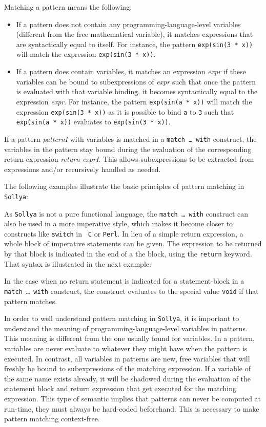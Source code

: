 \documentclass[a4paper]{article}
\newcommand{\key}[1]{\texttt{#1}}
\newcommand{\sollya}{\texttt{Sollya}\xspace}
\begin{document}
Matching a pattern means the following: 
\begin{itemize}
  \item If a pattern does not contain any programming-language-level
    variables (different from the free mathematical variable), it
    matches expressions that are syntactically equal to itself. For
    instance, the pattern \key{exp(sin(3 * x))} will match the
    expression \key{exp(sin(3 * x))}.
  \item If a pattern does contain variables, it matches an expression
    {\it expr} if these variables can be bound to subexpressions of
    {\it expr} such that once the pattern is evaluated with that
    variable binding, it becomes syntactically equal to the expression
    {\it expr}. For instance, the pattern \key{exp(sin(a * x))} will
    match the expression \key{exp(sin(3 * x))} as it is possible to
    bind \key{a} to \key{3} such that \key{exp(sin(a~*~x))} evaluates
    to \key{exp(sin(3~*~x))}.
\end{itemize}

If a pattern {\it patternI} with variables is matched in a \key{match
  \dots~with} construct, the variables in the pattern stay bound
during the evaluation of the corresponding return expression {\it
  return-exprI}. This allows subexpressions to be extracted from
expressions and/or recursively handled as needed.

The following examples illustrate the basic principles of pattern
matching in \sollya:



As \sollya is not a pure functional language, the \key{match
  \dots~with} construct can also be used in a more imperative style,
which makes it become closer to constructs like \key{switch} in {\tt
  C} or {\tt Perl}. In lieu of a simple return expression, a whole
block of imperative statements can be given. The expression to be
returned by that block is indicated in the end of a the block, using
the \key{return} keyword. That syntax is illustrated in the next
example:



In the case when no return statement is indicated for a
statement-block in a \key{match \dots~with} construct, the construct
evaluates to the special value \key{void} if that pattern matches. 

In order to well understand pattern matching in \sollya, it is
important to understand the meaning of programming-language-level
variables in patterns. This meaning is different from the one usually
found for variables. In a pattern, variables are never evaluate to
whatever they might have when the pattern is executed. In contrast,
all variables in patterns are new, free variables that will freshly be
bound to subexpressions of the matching expression. If a variable of
the same name exists already, it will be shadowed during the
evaluation of the statement block and return expression that get
executed for the matching expression. This type of semantic implies
that patterns can never be computed at run-time, they must always be
hard-coded beforehand. This is necessary to make pattern matching
context-free.
\end{document}
